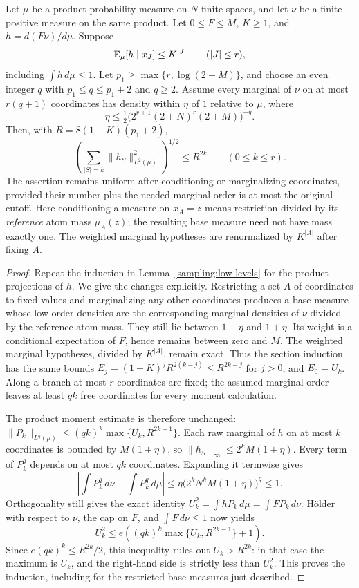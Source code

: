 \begin{lemma}
\label{sampling:approx-low-levels}
Let $\mu$ be a product probability measure on $N$ finite spaces,
and let $\nu$ be a finite positive measure on the same product.  Let
$0\le F\le M$, $K\ge1$, and $h=d(F\nu)/d\mu$.  Suppose
\[
 \mathbb E_\mu[h\mid x_J]\le K^{|J|}\qquad(|J|\le r),
\]
including $\int h\,d\mu\le1$.  Let $p_1\ge\max\{r,\log(2+M)\}$,
and choose an even integer $q$ with $p_1\le q\le p_1+2$ and $q\ge2$.
Assume every marginal of $\nu$ on at most $r(q+1)$ coordinates has density
within $\eta$ of $1$ relative to $\mu$, where
\[
 \eta\le\tfrac12\bigl(2^{r+1}(2+N)^r(2+M)\bigr)^{-q}.
\]
Then, with $R=8(1+K)(p_1+2)$,
\[
 \left(\sum_{|S|=k}\|h_S\|_{L^2(\mu)}^2\right)^{1/2}
 \le R^{2k}\qquad(0\le k\le r).
\]
The assertion remains uniform after conditioning or marginalizing
coordinates, provided their number plus the needed marginal order is at
most the original cutoff.  Here conditioning a measure on $x_A=z$ means
restriction divided by its \emph{reference} atom mass $\mu_A(z)$; the
resulting base measure need not have mass exactly one.  The weighted
marginal hypotheses are renormalized by $K^{|A|}$ after fixing $A$.
\end{lemma}
\begin{proof}
Repeat the induction in Lemma~\ref{sampling:low-levels} for the product
projections of $h$.  We give the changes explicitly.  Restricting a set
$A$ of coordinates to fixed values and marginalizing any other coordinates
produces a base measure whose low-order densities are the corresponding
marginal densities of $\nu$ divided by the reference atom mass.  They
still lie between $1-\eta$ and $1+\eta$.  Its weight is a conditional
expectation of $F$, hence remains between zero and $M$.  The weighted
marginal hypotheses, divided by $K^{|A|}$, remain exact.  Thus the
section induction has the same bounds
$E_j=(1+K)^jR^{2(k-j)}\le R^{2k-j}$ for $j>0$, and $E_0=U_k$.
Along a branch at most $r$ coordinates are fixed; the assumed marginal
order leaves at least $qk$ free coordinates for every moment calculation.

The product moment estimate is therefore unchanged:
$\|P_k\|_{L^q(\mu)}\le(qk)^k\max\{U_k,R^{2k-1}\}$.
Each raw marginal of $h$ on at most $k$ coordinates is bounded by
$M(1+\eta)$, so $\|h_S\|_\infty\le2^kM(1+\eta)$.
Every term of $P_k^q$ depends on at most $qk$ coordinates.
Expanding it termwise gives
\[
 \left|\int P_k^q\,d\nu-\int P_k^q\,d\mu\right|
 \le\eta\bigl(2^kN^kM(1+\eta)\bigr)^q\le1.
\]
Orthogonality still gives the exact identity
$U_k^2=\int hP_k\,d\mu=\int FP_k\,d\nu$.
H\"older with respect to $\nu$, the cap on $F$, and
$\int F\,d\nu\le1$ now yields
\[
 U_k^2\le e\left((qk)^k\max\{U_k,R^{2k-1}\}+1\right).
\]
Since $e(qk)^k\le R^{2k}/2$, this inequality rules out $U_k>R^{2k}$:
in that case the maximum is $U_k$, and the right-hand side is strictly
less than $U_k^2$.  This proves the induction, including for the restricted
base measures just described.
\end{proof}

